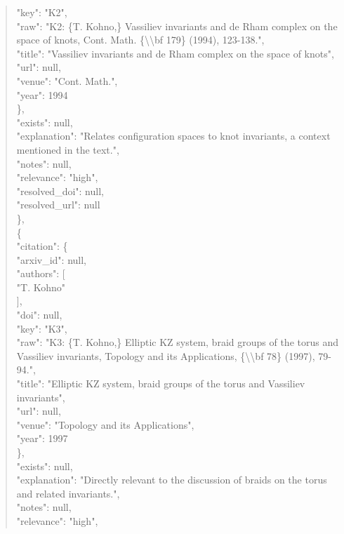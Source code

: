 \documentclass[11pt]{article}
\begin{document}
\begin{quote}
        "key": "K2",\\
        "raw": "K2: \{T. Kohno,\} Vassiliev invariants and de Rham complex on the space of knots, Cont. Math. \{\textbackslash{}\textbackslash{}bf 179\} (1994), 123-138.",\\
        "title": "Vassiliev invariants and de Rham complex on the space of knots",\\
        "url": null,\\
        "venue": "Cont. Math.",\\
        "year": 1994\\
      \},\\
      "exists": null,\\
      "explanation": "Relates configuration spaces to knot invariants, a context mentioned in the text.",\\
      "notes": null,\\
      "relevance": "high",\\
      "resolved\_doi": null,\\
      "resolved\_url": null\\
    \},\\
    \{\\
      "citation": \{\\
        "arxiv\_id": null,\\
        "authors": [\\
          "T. Kohno"\\
        ],\\
        "doi": null,\\
        "key": "K3",\\
        "raw": "K3: \{T. Kohno,\} Elliptic KZ system, braid groups of the torus and Vassiliev invariants, Topology and its Applications, \{\textbackslash{}\textbackslash{}bf 78\} (1997), 79-94.",\\
        "title": "Elliptic KZ system, braid groups of the torus and Vassiliev invariants",\\
        "url": null,\\
        "venue": "Topology and its Applications",\\
        "year": 1997\\
      \},\\
      "exists": null,\\
      "explanation": "Directly relevant to the discussion of braids on the torus and related invariants.",\\
      "notes": null,\\
      "relevance": "high",\\

\end{quote}
\end{document}
